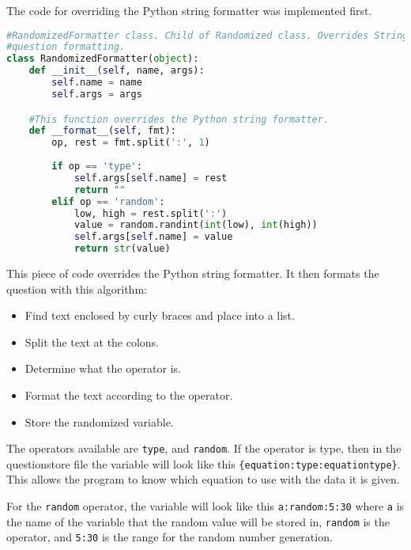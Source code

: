 The code for overriding the Python string formatter was implemented first.
\begin{lstlisting}[language=Python, caption=Formatter override]
#RandomizedFormatter class. Child of Randomized class. Overrides String formatter to allow
#question formatting.
class RandomizedFormatter(object):
	def __init__(self, name, args):
		self.name = name
		self.args = args

	#This function overrides the Python string formatter.
	def __format__(self, fmt):
		op, rest = fmt.split(':', 1)
		
		if op == 'type':
			self.args[self.name] = rest
			return ""
		elif op == 'random':
			low, high = rest.split(':')
			value = random.randint(int(low), int(high))
			self.args[self.name] = value
			return str(value)
\end{lstlisting}
This piece of code overrides the Python string formatter. It then formats the question with this algorithm:
\begin{itemize}
	\item Find text enclosed by curly braces and place into a list.
	\item Split the text at the colons.
	\item Determine what the operator is.
	\item Format the text according to the operator.
	\item Store the randomized variable.
\end{itemize}
The operators available are \texttt{type}, and \texttt{random}. If the operator is type, then in the questionstore file the variable will look like this \texttt{\{equation:type:equationtype\}}. This allows the program to know which equation to use with the data it is given.

For the \texttt{random} operator, the variable will look like this \texttt{a:random:5:30} where \texttt{a} is the name of the variable that the random value will be stored in, \texttt{random} is the operator, and \texttt{5:30} is the range for the random number generation. 

